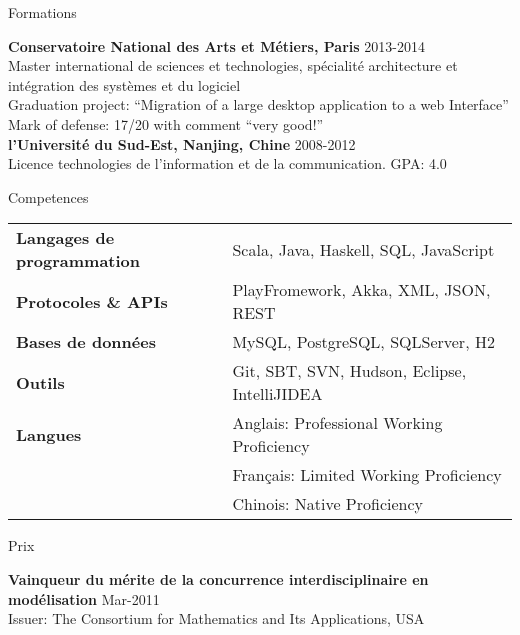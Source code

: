 \documentclass{resume} %
\begin{document}
\begin{rSection}{Formations}

{\bf Conservatoire National des Arts et Métiers, Paris} \hfill {2013-2014} \\ 
Master international de sciences et technologies, spécialité architecture et intégration des systèmes et du logiciel\\
Graduation project: ``Migration of a large desktop application to a web Interface''\\
Mark of defense: 17/20 with comment ``very good!''\medskip\\
{\bf l’Université du Sud-Est, Nanjing, Chine} \hfill {2008-2012}\\
Licence technologies de l’information et de la communication.
GPA: 4.0

\end{rSection}


\begin{rSection}{Competences}

\begin{tabular}{ @{} >{\bfseries}l @{\hspace{6ex}} l }
Langages de programmation & Scala, Java, Haskell, SQL, JavaScript \\
Protocoles \& APIs & PlayFromework, Akka, XML, JSON, REST \\
Bases de données & MySQL, PostgreSQL, SQLServer, H2 \\
Outils & Git, SBT, SVN, Hudson, Eclipse, IntelliJIDEA \\
Langues & Anglais: Professional Working Proficiency \\
        & Français: Limited Working Proficiency \\
        & Chinois: Native Proficiency 
\end{tabular}

\end{rSection}


\begin{rSection}{Prix}

{\bf Vainqueur du mérite de la concurrence interdisciplinaire en modélisation} \hfill {Mar-2011}\\
Issuer: The Consortium for Mathematics and Its Applications, USA
  
\end{rSection}
\end{document}
